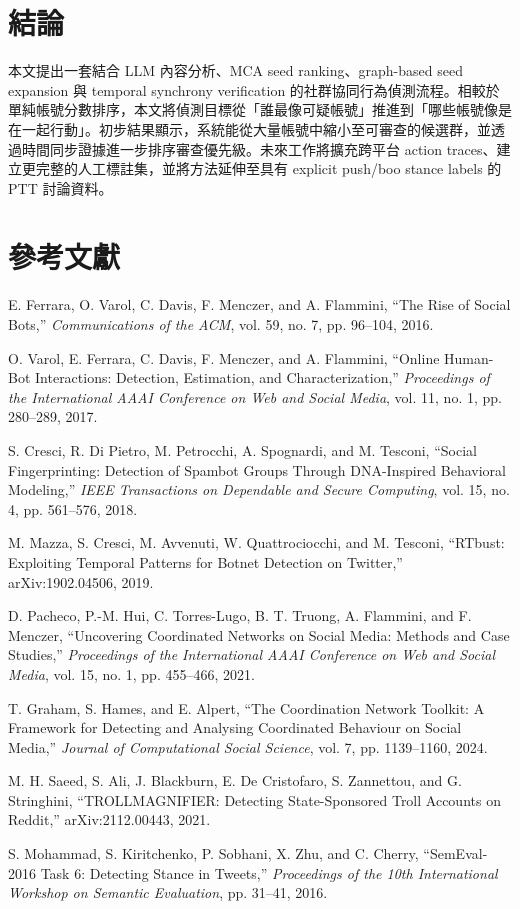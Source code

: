 \documentclass[conference]{IEEEtran}
\begin{document}
\section{結論}

本文提出一套結合 LLM 內容分析、MCA seed ranking、graph-based seed expansion 與 temporal synchrony verification 的社群協同行為偵測流程。相較於單純帳號分數排序，本文將偵測目標從「誰最像可疑帳號」推進到「哪些帳號像是在一起行動」。初步結果顯示，系統能從大量帳號中縮小至可審查的候選群，並透過時間同步證據進一步排序審查優先級。未來工作將擴充跨平台 action traces、建立更完整的人工標註集，並將方法延伸至具有 explicit push/boo stance labels 的 PTT 討論資料。

\section*{參考文獻}
\small
\noindent [1] E. Ferrara, O. Varol, C. Davis, F. Menczer, and A. Flammini, ``The Rise of Social Bots,'' \textit{Communications of the ACM}, vol. 59, no. 7, pp. 96--104, 2016.\par
\noindent [2] O. Varol, E. Ferrara, C. Davis, F. Menczer, and A. Flammini, ``Online Human-Bot Interactions: Detection, Estimation, and Characterization,'' \textit{Proceedings of the International AAAI Conference on Web and Social Media}, vol. 11, no. 1, pp. 280--289, 2017.\par
\noindent [3] S. Cresci, R. Di Pietro, M. Petrocchi, A. Spognardi, and M. Tesconi, ``Social Fingerprinting: Detection of Spambot Groups Through DNA-Inspired Behavioral Modeling,'' \textit{IEEE Transactions on Dependable and Secure Computing}, vol. 15, no. 4, pp. 561--576, 2018.\par
\noindent [4] M. Mazza, S. Cresci, M. Avvenuti, W. Quattrociocchi, and M. Tesconi, ``RTbust: Exploiting Temporal Patterns for Botnet Detection on Twitter,'' arXiv:1902.04506, 2019.\par
\noindent [5] D. Pacheco, P.-M. Hui, C. Torres-Lugo, B. T. Truong, A. Flammini, and F. Menczer, ``Uncovering Coordinated Networks on Social Media: Methods and Case Studies,'' \textit{Proceedings of the International AAAI Conference on Web and Social Media}, vol. 15, no. 1, pp. 455--466, 2021.\par
\noindent [6] T. Graham, S. Hames, and E. Alpert, ``The Coordination Network Toolkit: A Framework for Detecting and Analysing Coordinated Behaviour on Social Media,'' \textit{Journal of Computational Social Science}, vol. 7, pp. 1139--1160, 2024.\par
\noindent [7] M. H. Saeed, S. Ali, J. Blackburn, E. De Cristofaro, S. Zannettou, and G. Stringhini, ``TROLLMAGNIFIER: Detecting State-Sponsored Troll Accounts on Reddit,'' arXiv:2112.00443, 2021.\par
\noindent [8] S. Mohammad, S. Kiritchenko, P. Sobhani, X. Zhu, and C. Cherry, ``SemEval-2016 Task 6: Detecting Stance in Tweets,'' \textit{Proceedings of the 10th International Workshop on Semantic Evaluation}, pp. 31--41, 2016.\par
\end{document}
